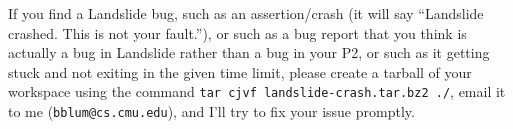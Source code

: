 \documentclass{article}
\begin{document}
 If you find a Landslide bug, such as an assertion/crash (it will say ``Landslide crashed. This is not your fault.''), or such as a
bug report that you think is actually a bug in Landslide rather than a bug in your P2, or such as it getting stuck
and not exiting in the given time limit, please create a tarball of your workspace
using the command {\tt tar cjvf landslide-crash.tar.bz2 ./},
email it to me ({\tt bblum@cs.cmu.edu}), and I'll try to fix your issue promptly.
\\
\end{document}
